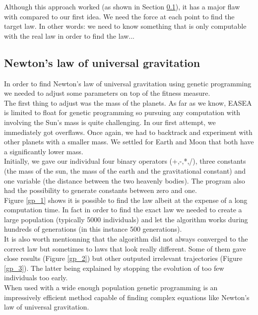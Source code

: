 Although this approach worked (as shown in Section \ref{gp}), it
has a major flaw with compared to our first idea. We need the force at each
point to find
the target law. In other words: we need to know something that is only
computable with the
real law in order to find the law...\\

\subsection{Newton's law of universal gravitation}
\label{gp}
In order to find Newton's law of universal gravitation using genetic
programming we needed to adjust some parameters on top of the fitness
measure.\\

The first thing to adjust was the mass of the planets. As far as we know, EASEA
is limited to float for genetic programming so pursuing any computation with
involving the Sun's mass is quite challenging. In our first attempt, we
immediately got overflaws. Once again, we had to backtrack and experiment with
other planets with a smaller mass. We settled for Earth and Moon that both have
a significantly lower mass.\\

Initially, we gave our individual four binary operators (+,-,*,/), three
constants (the mass of the sun, the mass of the earth and the gravitational
constant) and
one variable (the distance between the two heavenly bodies). The program also
had the possibility to generate constants between zero and one.\\

Figure \ref{gp_1} shows it is possible to find the law albeit at the expense of
a long computation time. In fact in order to find the exact law we needed to
create a large population (typically 5000 individuals) and let the algorithm
works during hundreds of generations (in this instance 500 generations).\\

It is also worth mentionning that the algorithm did not always converged to the
correct law but sometimes to laws that look really different. Some of them gave close results (Figure
\ref{gp_2}) but other outputed irrelevant trajectories (Figure
\ref{gp_3}). The latter being explained by stopping the evolution of too few individuals too early.\\

When used with a wide enough population genetic programming is an impressively efficient method capable of finding complex equations like Newton's law of universal gravitation.\\

